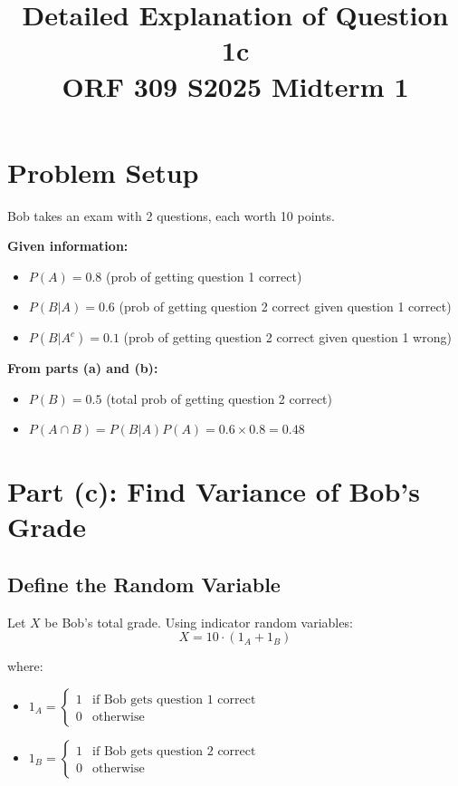 \documentclass[11pt]{article}
\title{Detailed Explanation of Question 1c\\ORF 309 S2025 Midterm 1}
\author{}
\date{}
\begin{document}
\maketitle

\section{Problem Setup}

Bob takes an exam with 2 questions, each worth 10 points.

\textbf{Given information:}
\begin{itemize}
    \item $P(A) = 0.8$ (prob of getting question 1 correct)
    \item $P(B|A) = 0.6$ (prob of getting question 2 correct given question 1 correct)
    \item $P(B|A^c) = 0.1$ (prob of getting question 2 correct given question 1 wrong)
\end{itemize}

\textbf{From parts (a) and (b):}
\begin{itemize}
    \item $P(B) = 0.5$ (total prob of getting question 2 correct)
    \item $P(A \cap B) = P(B|A)P(A) = 0.6 \times 0.8 = 0.48$
\end{itemize}

\section{Part (c): Find Variance of Bob's Grade}

\subsection{Define the Random Variable}

Let $X$ be Bob's total grade. Using indicator random variables:
\begin{equation}
X = 10 \cdot (1_A + 1_B)
\end{equation}

where:
\begin{itemize}
    \item $1_A = \begin{cases} 1 & \text{if Bob gets question 1 correct} \\ 0 & \text{otherwise} \end{cases}$
    \item $1_B = \begin{cases} 1 & \text{if Bob gets question 2 correct} \\ 0 & \text{otherwise} \end{cases}$
\end{itemize}
\end{document}
